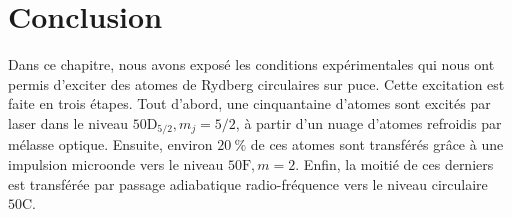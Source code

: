 %
%

\clearpage
\section*{Conclusion}
\noindent Dans ce chapitre, nous avons exposé les conditions expérimentales qui nous ont permis d'exciter des atomes de Rydberg circulaires sur puce.
Cette excitation est faite en trois étapes.
Tout d'abord, une cinquantaine d'atomes sont excités par laser dans le niveau $\mathrm{50D}_{5/2},m_j=5/2$, à partir d'un nuage d'atomes refroidis par mélasse optique.
Ensuite, environ $\SI{20}{\percent}$ de ces atomes sont transférés grâce à une impulsion microonde vers le niveau $\mathrm{50F},m=2$.
Enfin, la moitié de ces derniers est transférée par passage adiabatique radio-fréquence vers le niveau circulaire $\mathrm{50C}$.

